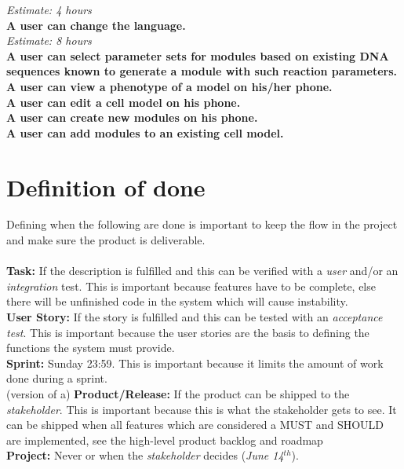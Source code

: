 \documentclass[10pt,a4paper]{report}
\begin{document}
		\indent
			\emph{Estimate: 4 hours} \\
		\textbf{A user can change the language.} \\
		\indent
			\emph{Estimate: 8 hours} \\
		\textbf{A user can select parameter sets for modules based on existing DNA sequences known to generate a module with such reaction parameters.} \\
		\textbf{A user can view a phenotype of a model on his/her phone.} \\
		\textbf{A user can edit a cell model on his phone.} \\
		\textbf{A user can create new modules on his phone.} \\
		\textbf{A user can add modules to an existing cell model.} \\

	\clearpage
	\section{Definition of done}
		Defining when the following are done is important to keep the flow in the project and make sure the product is deliverable. \\
		\\
		\textbf{Task:} If the description is fulfilled and this can be verified with a \emph{user} and/or an \emph{integration} test. {\scriptsize This is important because features have to be complete, else there will be unfinished code in the system which will cause instability.}\\
		\textbf{User Story:} If the story is fulfilled and this can be tested with an \emph{acceptance test}.  {\scriptsize This is important because the user stories are the basis to defining the functions the system must provide.}\\
		\textbf{Sprint:} Sunday 23:59. { \scriptsize This is important because it limits the amount of work done during a sprint.}\\
		(version of a) \textbf{Product/Release:} If the product can be shipped to the \emph{stakeholder}. { \scriptsize This is important because this is what the stakeholder gets to see. It can be shipped when all features which are considered a MUST and SHOULD are implemented, see the high-level product backlog and roadmap} \\
		\textbf{Project:} Never or when the \emph{stakeholder} decides (\emph{June 14$^{th}$}).
\end{document}
